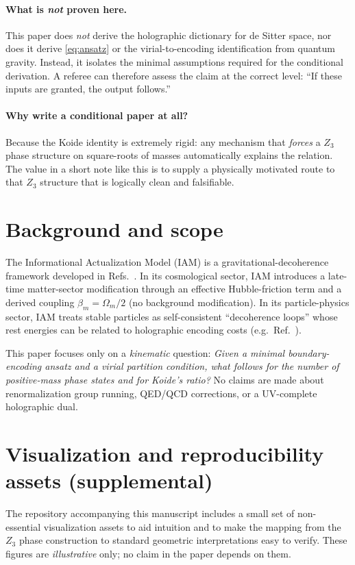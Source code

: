 \documentclass[12pt,a4paper]{article}
\begin{document}
\paragraph{What is \emph{not} proven here.}
This paper does \emph{not} derive the holographic dictionary for de Sitter space, nor does it derive \eqref{eq:ansatz} or the virial-to-encoding identification from quantum gravity.
Instead, it isolates the minimal assumptions required for the conditional derivation.
A referee can therefore assess the claim at the correct level: ``If these inputs are granted, the output follows.''

\paragraph{Why write a conditional paper at all?}
Because the Koide identity is extremely rigid: any mechanism that \emph{forces} a $Z_3$ phase structure on square-roots of masses automatically explains the relation.
The value in a short note like this is to supply a physically motivated route to that $Z_3$ structure that is logically clean and falsifiable.

\section{Background and scope}
\label{sec:scope}

The Informational Actualization Model (IAM) is a gravitational-decoherence framework developed in Refs.~\cite{iam_theory,iam_obs,virial_paper,electron_mass}.
In its cosmological sector, IAM introduces a late-time matter-sector modification through an effective Hubble-friction term and a derived coupling $\beta_m=\Omega_m/2$ (no background modification).
In its particle-physics sector, IAM treats stable particles as self-consistent ``decoherence loops'' whose rest energies can be related to holographic encoding costs (e.g.\ Ref.~\cite{electron_mass}).

This paper focuses only on a \emph{kinematic} question:
\emph{Given a minimal boundary-encoding ansatz and a virial partition condition, what follows for the number of positive-mass phase states and for Koide's ratio?}
No claims are made about renormalization group running, QED/QCD corrections, or a UV-complete holographic dual.


\section{Visualization and reproducibility assets (supplemental)}
\label{sec:fig_assets}
The repository accompanying this manuscript includes a small set of
non-essential visualization assets to aid intuition and to make the mapping
from the $Z_3$ phase construction to standard geometric interpretations easy
to verify.  These figures are \emph{illustrative} only; no claim in the paper
depends on them.
\end{document}
